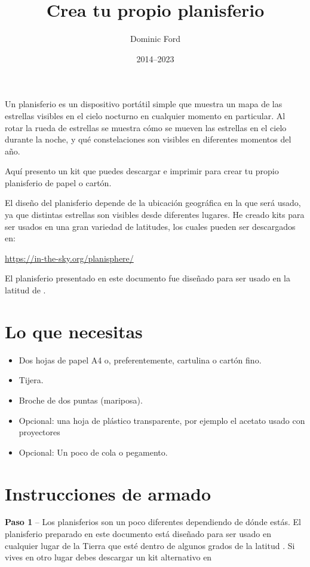 \documentclass[a4paper,onecolumn,10pt]{article}
\title{Crea tu propio planisferio}
\author{Dominic Ford}
\date{2014--2023}
\begin{document}
\maketitle
\setcounter{footnote}{1}

Un planisferio es un dispositivo portátil simple que muestra un mapa de las estrellas visibles
en el cielo nocturno en cualquier momento en particular. Al rotar la rueda de estrellas se muestra
cómo se mueven las estrellas en el cielo durante la noche, y qué constelaciones son visibles
en diferentes momentos del año.

Aquí presento un kit que puedes descargar e imprimir para crear tu propio
planisferio de papel o cartón.

El diseño del planisferio depende de la ubicación geográfica en la que será usado,
ya que distintas estrellas son visibles desde diferentes lugares. He creado kits
para ser usados en una gran variedad de latitudes, los cuales pueden ser descargados en:

\url{https://in-the-sky.org/planisphere/}

El planisferio presentado en este documento fue diseñado para ser usado en la latitud de
.

\section*{Lo que necesitas}

\begin{itemize}
\item Dos hojas de papel A4 o, preferentemente, cartulina o cartón fino.
\item Tijera.
\item Broche de dos puntas (mariposa).
\item Opcional: una hoja de plástico transparente, por ejemplo el acetato usado con proyectores
\item Opcional: Un poco de cola o pegamento.
\end{itemize}

\section*{Instrucciones de armado}

{\bf Paso 1} -- Los planisferios son un poco diferentes dependiendo de dónde estás.
El planisferio preparado en este documento está diseñado para ser usado en cualquier
lugar de la Tierra que esté dentro de algunos grados de la latitud .
Si vives en otro lugar debes descargar un kit alternativo en
\end{document}
